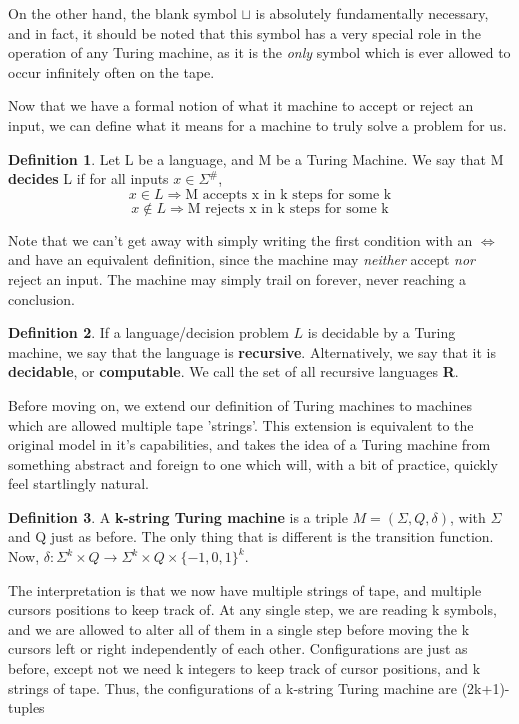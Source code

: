 \documentclass{article}
\theoremstyle{definition}
\newtheorem{definition}{Definition}[section]
\theoremstyle{plain}
\theoremstyle{theorem}
\begin{document}
On the other hand, the blank symbol $\sqcup$ is absolutely fundamentally necessary, and in fact, it should be noted that this symbol has a very special role in the operation of any Turing machine, as it is the \textit{only} symbol which is ever allowed to occur infinitely often on the tape. \par 
Now that we have a formal notion of what it machine to accept or reject an input, we can define what it means for a machine to truly solve a problem for us.
\begin{definition}
Let L be a language, and M be a Turing Machine. We say that M \textbf{decides} L if for all inputs $x\in\Sigma^\#$,
\[x\in L \Rightarrow \textrm{M accepts x in k steps for some k} \]
\[x \notin L \Rightarrow \textrm{M rejects x in k steps for some k}\]
\end{definition}
Note that we can't get away with simply writing the first condition with an $\iff$ and have an equivalent definition, since the machine may \textit{neither} accept \textit{nor} reject an input. The machine may simply trail on forever, never reaching a conclusion.
\begin{definition}
    If a language/decision problem $L$ is decidable by a Turing machine, we say that the language is \textbf{recursive}. Alternatively, we say that it is \textbf{decidable}, or \textbf{computable}. We call the set of all recursive languages \textbf{R}.
\end{definition}
Before moving on, we extend our definition of Turing machines to machines which are allowed multiple tape 'strings'. This extension is equivalent to the original model in it's capabilities, and takes the idea of a Turing machine from something abstract and foreign to one which will, with a bit of practice, quickly feel startlingly natural.
\begin{definition}
A \textbf{k-string Turing machine} is a triple $M=(\Sigma,Q,\delta)$, with $\Sigma$ and Q just as before. The only thing that is different is the transition function. Now, $\delta: \Sigma^k \times Q \to \Sigma^k \times Q \times \{-1,0,1\}^k$.
\end{definition}
The interpretation is that we now have multiple strings of tape, and multiple cursors positions to keep track of. At any single step, we are reading k symbols, and we are allowed to alter all of them in a single step before moving the k cursors left or right independently of each other. Configurations are just as before, except not we need k integers to keep track of cursor positions, and k strings of tape. Thus, the configurations of a k-string Turing machine are (2k+1)-tuples
\end{document}
